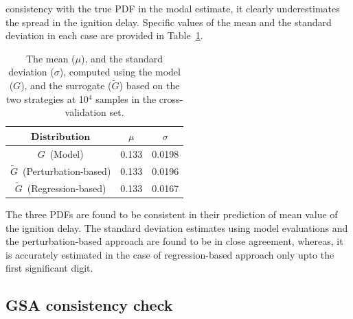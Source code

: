 consistency with the true PDF in the modal
estimate, it clearly underestimates the spread in the ignition delay. Specific values of the mean and the standard 
deviation in each case are provided in Table~\ref{tab:stats}. 
%
\begin{table}[htbp]
\begin{center}
\begin{tabular}{ccc}
\toprule
$\textbf{Distribution}$ & $\mu$ & $\sigma$ \\ 
\bottomrule
$G$~(Model) & 0.133 & 0.0198 \\
$\tilde{G}$~(Perturbation-based) & 0.133 & 0.0196 \\
$\tilde{G}$~(Regression-based) & 0.133 & 0.0167 \\
\bottomrule
\end{tabular}
\caption{The mean ($\mu$), and the standard deviation ($\sigma$), computed using the model ($G$), and
the surrogate ($\tilde{G}$) based on the two strategies at 10$^4$ samples in the cross-validation
set.}
\label{tab:stats}
\end{center}
\end{table}
%
The three PDFs are found to be
consistent in their prediction of mean value of the ignition delay.  The standard deviation estimates using model
evaluations and the perturbation-based approach are found to be in close agreement, whereas, it  is accurately
 estimated in the case of regression-based approach only upto the first significant digit. 

\subsection{GSA consistency check}

